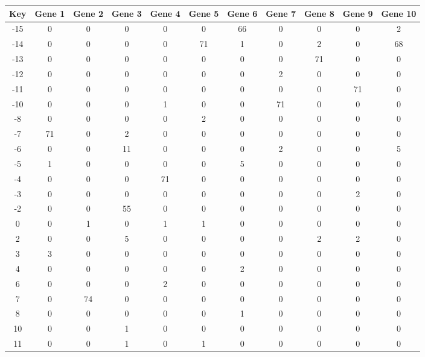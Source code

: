 \begin{tabular}{|c|c|c|c|c|c|c|c|c|c|c|}
\hline
Key & Gene 1 & Gene 2 & Gene 3 & Gene 4 & Gene 5 & Gene 6 & Gene 7 & Gene 8 & Gene 9 & Gene 10 \\
\hline
-15 & 0 & 0 & 0 & 0 & 0 & 66 & 0 & 0 & 0 & 2 \\
-14 & 0 & 0 & 0 & 0 & 71 & 1 & 0 & 2 & 0 & 68 \\
-13 & 0 & 0 & 0 & 0 & 0 & 0 & 0 & 71 & 0 & 0 \\
-12 & 0 & 0 & 0 & 0 & 0 & 0 & 2 & 0 & 0 & 0 \\
-11 & 0 & 0 & 0 & 0 & 0 & 0 & 0 & 0 & 71 & 0 \\
-10 & 0 & 0 & 0 & 1 & 0 & 0 & 71 & 0 & 0 & 0 \\
-8 & 0 & 0 & 0 & 0 & 2 & 0 & 0 & 0 & 0 & 0 \\
-7 & 71 & 0 & 2 & 0 & 0 & 0 & 0 & 0 & 0 & 0 \\
-6 & 0 & 0 & 11 & 0 & 0 & 0 & 2 & 0 & 0 & 5 \\
-5 & 1 & 0 & 0 & 0 & 0 & 5 & 0 & 0 & 0 & 0 \\
-4 & 0 & 0 & 0 & 71 & 0 & 0 & 0 & 0 & 0 & 0 \\
-3 & 0 & 0 & 0 & 0 & 0 & 0 & 0 & 0 & 2 & 0 \\
-2 & 0 & 0 & 55 & 0 & 0 & 0 & 0 & 0 & 0 & 0 \\
0 & 0 & 1 & 0 & 1 & 1 & 0 & 0 & 0 & 0 & 0 \\
2 & 0 & 0 & 5 & 0 & 0 & 0 & 0 & 2 & 2 & 0 \\
3 & 3 & 0 & 0 & 0 & 0 & 0 & 0 & 0 & 0 & 0 \\
4 & 0 & 0 & 0 & 0 & 0 & 2 & 0 & 0 & 0 & 0 \\
6 & 0 & 0 & 0 & 2 & 0 & 0 & 0 & 0 & 0 & 0 \\
7 & 0 & 74 & 0 & 0 & 0 & 0 & 0 & 0 & 0 & 0 \\
8 & 0 & 0 & 0 & 0 & 0 & 1 & 0 & 0 & 0 & 0 \\
10 & 0 & 0 & 1 & 0 & 0 & 0 & 0 & 0 & 0 & 0 \\
11 & 0 & 0 & 1 & 0 & 1 & 0 & 0 & 0 & 0 & 0 \\
\hline
\end{tabular}
